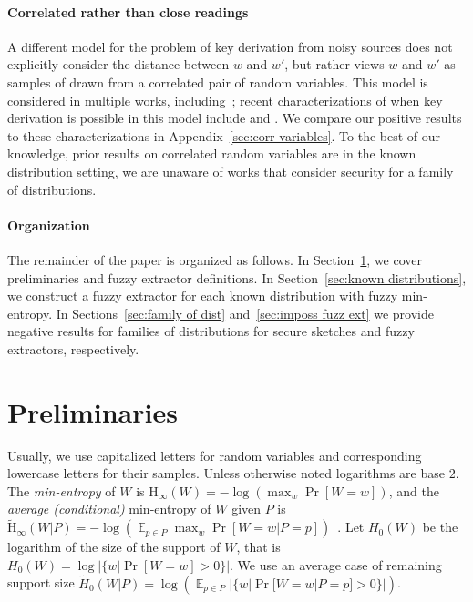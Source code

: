 \documentclass[11pt]{article}
\newcommand{\secref}[1]{\mbox{Section~\ref{#1}}}
\newcommand{\apref}[1]{\mbox{Appendix~\ref{#1}}}
\DeclareMathOperator*{\expe}{\mathbb{E}}
\newcommand{\Hoo}{\mathrm{H}_\infty}
\newcommand{\Hav}{\tilde{\mathrm{H}}_\infty}
\newcommand{\Hfuzz}{\mathrm{H}^{\mathtt{fuzz}}_{t,\infty}}
\begin{document}
\paragraph{Correlated rather than close readings}
A different model for the problem of key derivation from noisy sources does not explicitly consider the distance between $w$ and $w'$, but rather views $w$ and $w'$ as samples of drawn from a correlated pair of random variables.   This model is considered in multiple works, including~\cite{wyner1975wire,DBLP:journals/tit/CsiszarK78,DBLP:journals/tit/AhlswedeC93,DBLP:journals/tit/Maurer93}; recent characterizations of when key derivation is possible in this model include \cite{DBLP:conf/asiacrypt/RennerW05} and \cite{DBLP:journals/corr/TyagiW14}.  We compare our positive results to these characterizations in \apref{sec:corr variables}.  To the best of our knowledge, prior results on correlated random variables are in the known distribution setting, we are unaware of works that consider security for a family of distributions.


\paragraph{Organization} The remainder of the paper is organized as follows.  In \secref{sec:preliminaries}, we cover preliminaries and fuzzy extractor definitions.  In \secref{sec:known distributions}, we construct a fuzzy extractor for each known distribution with fuzzy min-entropy.  In Sections~\ref{sec:family of dist} and~\ref{sec:imposs fuzz ext} we provide negative results  for families of distributions for secure sketches and fuzzy extractors, respectively.


\section{Preliminaries}
\label{sec:preliminaries}
Usually, we use capitalized letters for random variables and corresponding lowercase letters for their samples.
 Unless otherwise noted logarithms are base $2$.
The {\em min-entropy} of $W$ is $\Hoo(W) = -\log(\max_w \Pr[W=w])$,
and the {\em average (conditional)} min-entropy of $W$ given $P$ is  $\Hav(W|P) = -\log(\expe_{p\in P} \max_{w} \Pr[W=w|P=p])$~\cite[Section 2.4]{DBLP:journals/siamcomp/DodisORS08}.   Let $H_0(W)$ be the logarithm of the size of the support of $W$,  that is $H_0(W) = \log |\{w | \Pr[W=w]>0\}|$.  We use an average case of remaining support size $\tilde{H}_0(W |P) = \log ( \expe_{p\in P} |\{w | \Pr[W=w |P=p]>0\}|)$.
\end{document}
